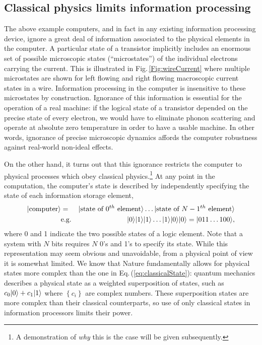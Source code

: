 \subsection{Classical physics limits information processing}


The above example computers, and in fact in any existing information processing device, ignore a great deal of information associated to the physical elements in the computer.
A particular state of a transistor implicitly includes an enormous set of possible microscopic states (``microstates'') of the individual electrons carrying the current.
This is illustrated in Fig.\,\ref{Fig:wireCurrent} where multiple microstates are shown for left flowing and right flowing macroscopic current states in a wire.
Information processing in the computer is insensitive to these microstates by construction.
Ignorance of this information is essential for the operation of a real machine: if the logical state of a transistor depended on the precise state of every electron, we would have to eliminate phonon scattering and operate at absolute zero temperature in order to have a usable machine.
In other words, ignorance of precise microscopic dynamics affords the computer robustness against real-world non-ideal effects.

On the other hand, it turns out that this ignorance restricts the computer to physical processes which obey classical physics.\footnote{A demonstration of \emph{why} this is the case will be given subsequently.}
At any point in the computation, the computer's state is described by independently specifying the state of each information storage element, \begin{eqnarray}
|\textrm{computer}\rangle &=& |\textrm{state of }0^{th}\textrm{ element}\rangle \ldots |\textrm{state of }N-1^{th} \textrm{ element}\rangle \nonumber \\
& \textrm{e.g.} & |0\rangle|1\rangle|1\rangle\ldots|1\rangle|0\rangle|0\rangle = |011 \ldots 100\rangle , \label{eq:classicalState} \end{eqnarray}
where 0 and 1 indicate the two possible states of a logic element.
Note that a system with $N$ bits requires $N$ 0's and 1's to specify its state.
While this representation may seem obvious and unavoidable, from a physical point of view it is somewhat limited.
We know that Nature fundamentally allows for physical states more complex than the one in Eq.\,(\ref{eq:classicalState}): quantum mechanics describes a physical state as a weighted superposition of states, such as $c_0 |0\rangle + c_1 |1\rangle$ where $ \left\{ c_i \right\} $ are complex numbers.
These superposition states are more complex than their classical counterparts, so use of only classical states in information processors limits their power.


